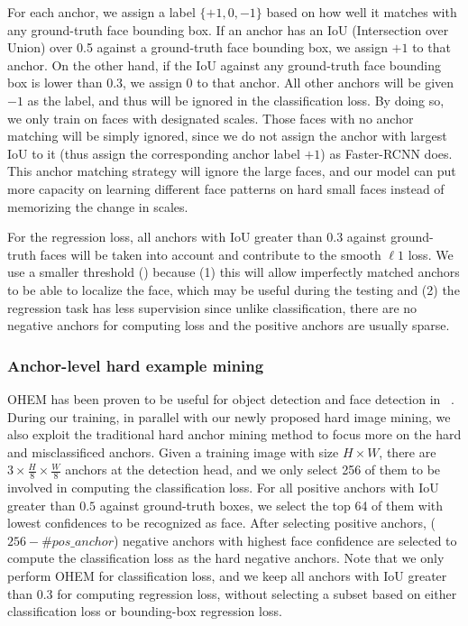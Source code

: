 \documentclass[10pt,twocolumn,letterpaper]{article}
\begin{document}
For each anchor, we assign a label $\{+1, 0, -1\}$ based on how well it matches with any ground-truth face bounding box. If an anchor has an IoU (Intersection over Union) over
0.5 against a ground-truth face bounding
box, we assign $+1$ to that anchor. On the other hand, if the IoU against any ground-truth
face bounding box is lower than 0.3, we assign $0$ to that anchor. All other anchors will be given $-1$
as the label, and thus will be ignored in the classification loss.
By doing so, we only train on faces with designated scales. Those faces with
no anchor matching will be simply ignored, since we do not assign the anchor with largest
IoU to it (thus assign the corresponding anchor label $+1$) as Faster-RCNN does.
This anchor matching
strategy will ignore the large faces, and our model can put more
capacity on learning different face patterns on hard small faces
instead of memorizing the change in scales.


For the regression loss, all anchors with IoU greater than 0.3 against ground-truth faces will
be taken into account and contribute to the smooth $\ell1$ loss. We use
a smaller threshold () because (1) this will allow imperfectly matched
anchors to be able to localize the face, which may be useful during the
testing and (2) the regression task has less supervision since unlike
classification, there are no negative anchors for computing loss and the positive anchors are usually
sparse.
\subsubsection*{Anchor-level hard example mining}\label{section:OHEM}
OHEM has been proven to be useful for object detection and face detection in ~\cite{liu2016ssd,najibi2017ssh,shrivastava2016training}. During our
training, in parallel with our newly proposed hard image mining,
we also exploit the traditional hard anchor mining method to focus more on the
hard and misclassificed anchors. Given a training image with size $H\times W$,
there are $3\times\frac{H}{8}\times\frac{W}{8}$ anchors at the detection head,
and we only select 256 of them to be involved in computing the classification loss. For
all positive anchors with IoU greater than $0.5$ against ground-truth boxes, we
select the top 64 of them with lowest confidences to be recognized as face. After selecting positive
anchors, ($256-\#pos\_anchor$) negative anchors with highest face confidence are selected
to compute the classification loss as the hard negative anchors. Note that we only perform OHEM for classification loss, and we keep all anchors with IoU greater than 0.3 for computing regression loss, without selecting a subset based on either classification loss or bounding-box regression loss.
\end{document}
